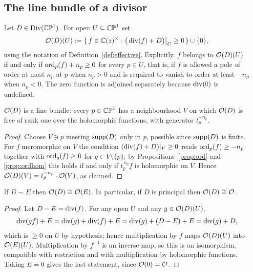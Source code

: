 \subsection{The line bundle of a divisor}

\begin{definition}\label{def:OD}
Let $D \in \operatorname{Div}(\mathbb{CP}^1)$. For open $U \subseteq \mathbb{CP}^1$ set
\[
\mathcal{O}(D)(U) := \{\, f \in \mathbb{C}(z)^\times : \big(\operatorname{div}(f) + D\big)\big|_U \geq 0 \,\}
\cup \{0\},
\]
using the notation of Definition~\ref{def:effective}. Explicitly, $f$ belongs to
$\mathcal{O}(D)(U)$ if and only if $\operatorname{ord}_p(f) + n_p \geq 0$ for every $p \in U$, that
is, if $f$ is allowed a pole of order at most $n_p$ at $p$ when $n_p > 0$ and is
required to vanish to order at least $-n_p$ when $n_p < 0$. The zero function is
adjoined separately because $\operatorname{div}(0)$ is undefined.
\end{definition}

\begin{smjproposition}\label{prop:ODbundle}
$\mathcal{O}(D)$ is a line bundle: every $p \in \mathbb{CP}^1$ has a neighbourhood $V$ on which
$\mathcal{O}(D)$ is free of rank one over the holomorphic functions, with generator
$t_p^{-n_p}$.
\end{smjproposition}

\begin{proof}
Choose $V \ni p$ meeting $\operatorname{supp}(D)$ only in $p$, possible since $\operatorname{supp}(D)$ is
finite. For $f$ meromorphic on $V$ the condition
$(\operatorname{div}(f)+D)|_V \geq 0$ reads $\operatorname{ord}_p(f) \geq -n_p$ together with
$\operatorname{ord}_q(f) \geq 0$ for $q \in V\setminus\{p\}$; by
Propositions~\ref{prop:ord} and \ref{prop:ordhom} this holds if and only if
$t_p^{\,n_p}f$ is holomorphic on $V$. Hence
$\mathcal{O}(D)(V) = t_p^{-n_p}\cdot \mathcal{O}(V)$, as claimed.
\end{proof}

\begin{smjproposition}\label{prop:ODinvariant}
If $D \sim E$ then $\mathcal{O}(D) \cong \mathcal{O}(E)$. In particular, if $D$ is principal
then $\mathcal{O}(D) \cong \mathcal{O}$.
\end{smjproposition}

\begin{proof}
Let $D - E = \operatorname{div}(f)$. For any open $U$ and any $g \in \mathcal{O}(D)(U)$,
\[
\operatorname{div}(gf) + E = \operatorname{div}(g) + \operatorname{div}(f) + E = \operatorname{div}(g) + (D-E) + E = \operatorname{div}(g) + D,
\]
which is $\geq 0$ on $U$ by hypothesis; hence multiplication by $f$ maps
$\mathcal{O}(D)(U)$ into $\mathcal{O}(E)(U)$. Multiplication by $f^{-1}$ is an inverse map,
so this is an isomorphism, compatible with restriction and with multiplication by
holomorphic functions. Taking $E = 0$ gives the last statement, since
$\mathcal{O}(0) = \mathcal{O}$.
\end{proof}


